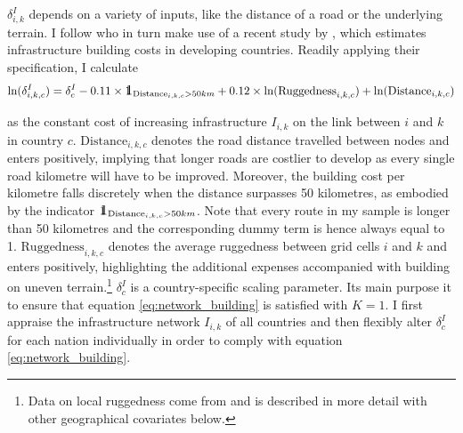 \documentclass[11pt, oneside]{article}   	%
\def\one{\mbox{1\hspace{-4.25pt}\fontsize{12}{14.4}\selectfont\textrm{1}}} %
\begin{document}
$\delta_{i,k}^{I}$ depends on a variety of inputs, like the distance of a road or the underlying terrain. I follow \citeauthor{Fajgelbaum_OptimalTransportNetworks_2017} who in turn make use of a recent study by \cite{Collier_CostRoadInfrastructure_2015}, which estimates infrastructure building costs in developing countries. Readily applying their specification, I calculate
\begin{equation}
  \textrm{ln}(\delta^{I}_{i,k,c}) = \delta_{c}^{I} - 0.11 \times \one_{\textrm{Distance}_{i,k,c} > 50km} + 0.12 \times \textrm{ln}(\textrm{Ruggedness}_{i,k,c}) + \textrm{ln}(\textrm{Distance}_{i,k,c})
  \label{eq:delta_I}
\end{equation}

as the constant cost of increasing infrastructure $I_{i,k}$ on the link between $i$ and $k$ in country $c$. $\textrm{Distance}_{i,k,c}$ denotes the road distance travelled between nodes and enters positively, implying that longer roads are costlier to develop as every single road kilometre will have to be improved. Moreover, the building cost per kilometre falls discretely when the distance surpasses 50 kilometres, as embodied by the indicator $\one_{\textrm{Distance}_{i,k,c} > 50km}$. Note that every route in my sample is longer than 50 kilometres and the corresponding dummy term is hence always equal to 1. $\textrm{Ruggedness}_{i,k,c}$ denotes the average ruggedness between grid cells $i$ and $k$ and enters positively, highlighting the additional expenses accompanied with building on uneven terrain.\footnote{Data on local ruggedness come from \cite{Henderson_GlobalSpatialDistribution_2018} and is described in more detail with other geographical covariates below.} $\delta_{c}^{I}$ is a country-specific scaling parameter. Its main purpose it to ensure that equation \eqref{eq:network_building} is satisfied with $K=1$. I first appraise the infrastructure network $I_{i,k}$ of all countries and then flexibly alter $\delta_{c}^{I}$ for each nation individually in order to comply with equation \eqref{eq:network_building}.
\end{document}
